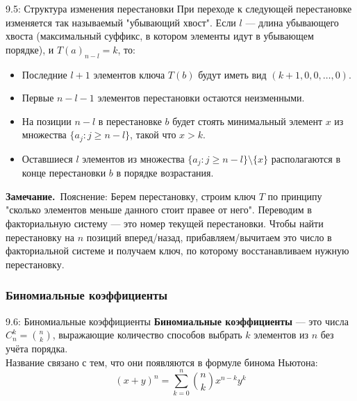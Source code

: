 \documentclass[a4paper,12pt]{article}
\newcommand{\myremark}{\textbf{Замечание.}\ }
\begin{document}
	\begin{theorembox}{9.5: Структура изменения перестановки}
		При переходе к следующей перестановке изменяется так называемый "убывающий хвост". Если $l$ — длина убывающего хвоста (максимальный суффикс, в котором элементы идут в убывающем порядке), и $T(a)_{n-l} = k$, то:
		
		\begin{itemize}
			\item Последние $l+1$ элементов ключа $T(b)$ будут иметь вид $(k+1, 0, 0, \dots, 0)$.
			\item Первые $n-l-1$ элементов перестановки остаются неизменными.
			\item На позиции $n-l$ в перестановке $b$ будет стоять минимальный элемент $x$ из множества $\{a_j : j \ge n-l\}$, такой что $x > k$.
			\item Оставшиеся $l$ элементов из множества $\{a_j : j \ge n-l\} \setminus \{x\}$ располагаются в конце перестановки $b$ в порядке возрастания.
		\end{itemize}
	\end{theorembox}
	
	\myremark{Пояснение:} Берем перестановку, строим ключ $T$ по принципу "сколько элементов меньше данного стоит правее от него". Переводим в факториальную систему — это номер текущей перестановки. Чтобы найти перестановку на $n$ позиций вперед/назад, прибавляем/вычитаем это число в факториальной системе и получаем ключ, по которому восстанавливаем нужную перестановку.
	
	\subsubsection{Биномиальные коэффициенты}
	
	\begin{definitionbox}{9.6: Биномиальные коэффициенты}
		\textbf{Биномиальные коэффициенты} — это числа $C_n^k = \binom{n}{k}$, выражающие количество способов выбрать $k$ элементов из $n$ без учёта порядка.\\
		
		Название связано с тем, что они появляются в формуле бинома Ньютона:
		\[ (x + y)^n = \sum_{k=0}^n \binom{n}{k} x^{n-k} y^k \]
	\end{definitionbox}
	
\end{document}
